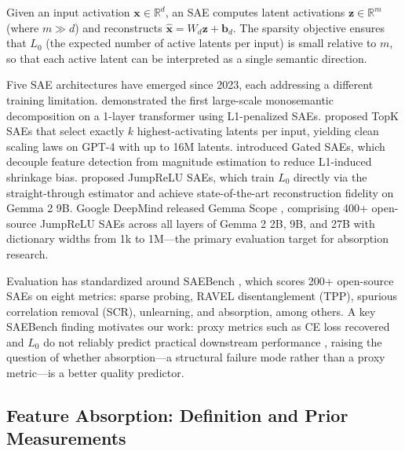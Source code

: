\documentclass{article}
\begin{document}
Given an input activation $\mathbf{x} \in \mathbb{R}^d$, an SAE computes latent activations $\mathbf{z} \in \mathbb{R}^m$ (where $m \gg d$) and reconstructs $\hat{\mathbf{x}} = W_d \mathbf{z} + \mathbf{b}_d$.
The sparsity objective ensures that $L_0$ (the expected number of active latents per input) is small relative to $m$, so that each active latent can be interpreted as a single semantic direction.

Five SAE architectures have emerged since 2023, each addressing a different training limitation.
\citet{bricken2023monosemanticity} demonstrated the first large-scale monosemantic decomposition on a 1-layer transformer using L1-penalized SAEs.
\citet{gao2024topk} proposed TopK SAEs that select exactly $k$ highest-activating latents per input, yielding clean scaling laws on GPT-4 with up to 16M latents.
\citet{rajamanoharan2024gated} introduced Gated SAEs, which decouple feature detection from magnitude estimation to reduce L1-induced shrinkage bias.
\citet{rajamanoharan2024jumprelu} proposed JumpReLU SAEs, which train $L_0$ directly via the straight-through estimator and achieve state-of-the-art reconstruction fidelity on Gemma 2 9B.
Google DeepMind released Gemma Scope \citep{lieberum2024gemmascope}, comprising 400+ open-source JumpReLU SAEs across all layers of Gemma 2 2B, 9B, and 27B with dictionary widths from 1k to 1M---the primary evaluation target for absorption research.

Evaluation has standardized around SAEBench \citep{karvonen2025saebench}, which scores 200+ open-source SAEs on eight metrics: sparse probing, RAVEL disentanglement (TPP), spurious correlation removal (SCR), unlearning, and absorption, among others.
A key SAEBench finding motivates our work: proxy metrics such as CE loss recovered and $L_0$ do not reliably predict practical downstream performance \citep[Table~3]{karvonen2025saebench}, raising the question of whether absorption---a structural failure mode rather than a proxy metric---is a better quality predictor.

\subsection{Feature Absorption: Definition and Prior Measurements}
\end{document}
